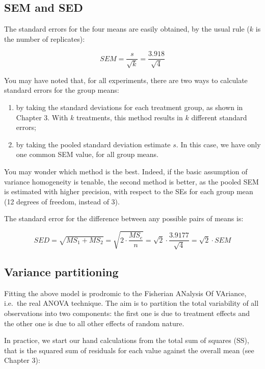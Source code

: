 \documentclass[a4paper,12pt,oneside]{book}
\providecommand{\tightlist}{%
  \setlength{\itemsep}{0pt}\setlength{\parskip}{0pt}}
\begin{document}
\hypertarget{sem-and-sed}{%
\subsection{SEM and SED}\label{sem-and-sed}}

The standard errors for the four means are easily obtained, by the usual rule (\(k\) is the number of replicates):

\[SEM = \frac{s}{ \sqrt{k}} =  \frac{3.918}{ \sqrt{4}}\]

You may have noted that, for all experiments, there are two ways to calculate standard errors for the group means:

\begin{enumerate}
\def\labelenumi{\arabic{enumi}.}
\tightlist
\item
  by taking the standard deviations for each treatment group, as shown in Chapter 3. With \(k\) treatments, this method results in \(k\) different standard errors;
\item
  by taking the pooled standard deviation estimate \(s\). In this case, we have only one common SEM value, for all group means.
\end{enumerate}

You may wonder which method is the best. Indeed, if the basic assumption of variance homogeneity is tenable, the second method is better, as the pooled SEM is estimated with higher precision, with respect to the SEs for each group mean (12 degrees of freedom, instead of 3).

The standard error for the difference between any possible pairs of means is:

\[SED = \sqrt{ MS_{1} + MS_{2} } = \sqrt{ 2 \cdot \frac{MS_e}{n} } =  \sqrt{2}  \cdot \frac{3.9177}{\sqrt{4}} = \sqrt{2} \cdot SEM\]

\hypertarget{variance-partitioning}{%
\subsection{Variance partitioning}\label{variance-partitioning}}

Fitting the above model is prodromic to the Fisherian ANalysis Of VAriance, i.e.~the real ANOVA technique. The aim is to partition the total variability of all observations into two components: the first one is due to treatment effects and the other one is due to all other effects of random nature.

In practice, we start our hand calculations from the total sum of squares (SS), that is the squared sum of residuals for each value against the overall mean (see Chapter 3):
\end{document}
